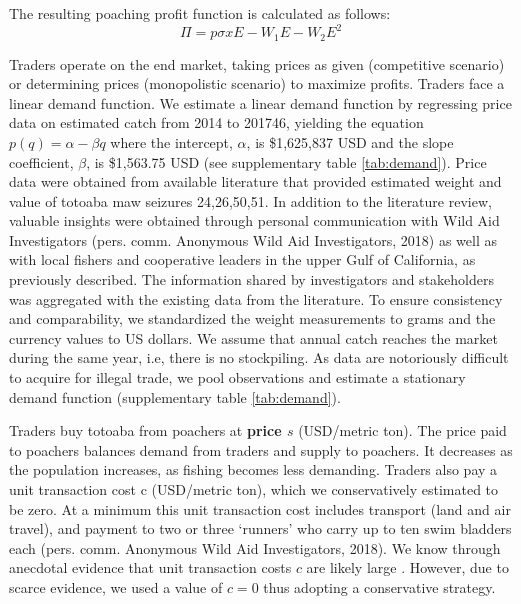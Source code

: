 The resulting poaching profit function is calculated as follows:
\begin{equation}
\Pi = p\sigma x E - W_1E - W_2E^2
\end{equation}

Traders operate on the end market, taking prices as given (competitive scenario) or determining prices (monopolistic scenario) to maximize profits. Traders face a linear demand function. We estimate a linear demand function by regressing price data on estimated catch from 2014 to 201746, yielding the equation $p(q) = \alpha - \beta q$ where the intercept, $\alpha$, is \$1,625,837 USD and the slope coefficient, $\beta$, is \$1,563.75 USD (see supplementary table \ref{tab:demand}). Price data were obtained from available literature that provided estimated weight and value of totoaba maw seizures 24,26,50,51. In addition to the literature review, valuable insights were obtained through personal communication with Wild Aid Investigators (pers. comm. Anonymous Wild Aid Investigators, 2018) as well as with local fishers and cooperative leaders in the upper Gulf of California, as previously described. The information shared by investigators and stakeholders was aggregated with the existing data from the literature. To ensure consistency and comparability, we standardized the weight measurements to grams and the currency values to US dollars. We assume that annual catch reaches the market during the same year, i.e, there is no stockpiling. As data are notoriously difficult to acquire for illegal trade, we pool observations and estimate a stationary demand function (supplementary table \ref{tab:demand}).

Traders buy totoaba from poachers at \textbf{price $s$} (USD/metric ton). The price paid to poachers balances demand from traders and supply to poachers. It decreases as the population increases, as fishing becomes less demanding. Traders also pay a unit transaction cost c (USD/metric ton), which we conservatively estimated to be zero. At a minimum this unit transaction cost includes transport (land and air travel), and payment to two or three ‘runners’ who carry up to ten swim bladders each (pers. comm. Anonymous Wild Aid Investigators, 2018). We know through anecdotal evidence that unit transaction costs $c$ are likely large \citep{elephant_action_league_operation_2018}. However, due to scarce evidence, we used a value of $c=0$ thus adopting a conservative strategy.
